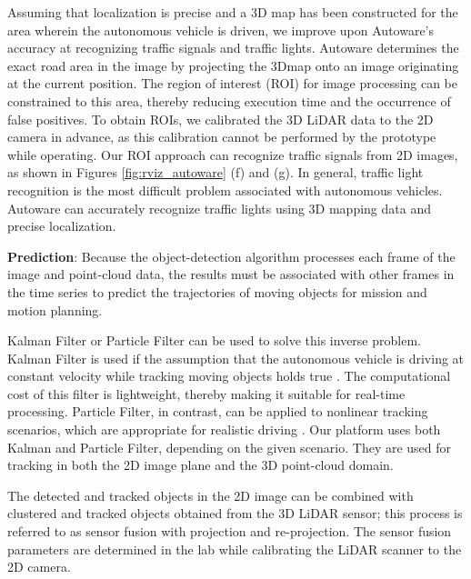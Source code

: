 Assuming that localization is precise and a 3D map has been constructed for the area
wherein the autonomous vehicle is driven, we improve upon Autoware's accuracy at recognizing traffic signals and traffic lights.
Autoware determines the exact road area in the image by projecting the 3Dmap onto an image originating at the current position.
The region of interest (ROI) for image
processing can be constrained to this area, thereby reducing execution time and
the occurrence of false positives.
To obtain ROIs, we calibrated the 3D LiDAR data to the 2D camera in advance, as
this calibration cannot be performed by the prototype while operating.
Our ROI approach can recognize traffic signals from 2D images, as shown in Figures \ref{fig:rviz_autoware} (f) and (g).
In general, traffic light recognition is the most
difficult problem associated with autonomous vehicles.
Autoware can accurately recognize traffic lights using 3D mapping data and precise
localization.



\textbf{Prediction}:
Because the object-detection algorithm processes each frame of the image and point-cloud data, the results must be associated with other frames in the time series to predict the trajectories of moving objects for mission and motion planning.

Kalman Filter or Particle Filter can be used to solve this inverse problem.
Kalman Filter is used if the assumption that the autonomous vehicle is driving at constant velocity while tracking moving objects holds true \cite{kalman1960new}.
The computational cost of this filter is lightweight, thereby making it suitable for real-time processing.
Particle Filter, in contrast, can be applied to nonlinear tracking scenarios, which are appropriate for realistic driving \cite{arulampalam2002tutorial}.
Our platform uses both Kalman and Particle Filter, depending on the given scenario.
They are used for tracking in both the 2D image plane and the 3D point-cloud domain.

The detected and tracked objects in the 2D image can be combined with clustered and tracked objects obtained from the 3D LiDAR sensor;
this process is referred to as sensor fusion with projection and re-projection.
The sensor fusion parameters are determined in the lab while calibrating the LiDAR scanner to the 2D camera.

